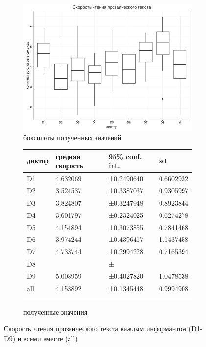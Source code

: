 \begin{figure}[t]
\begin{subfigure}[b]{0.53\textwidth}
        \includegraphics[width=\linewidth]{proseboxplot.pdf}
        \caption{боксплоты полученных значений}
\end{subfigure}
\hfill
\begin{subfigure}[b]{0.45\textwidth}
\small
\begin{tabular}{|l|l|l|l|}
\hline
диктор & средняя скорость & 95\% conf. int. & sd \\ \hline
D1 & 4.632069 & ±0.2490640 & 0.6602932 \\ \hline
D2 & 3.524537 & ±0.3387037 & 0.9305997 \\ \hline
D3 & 3.824807 & ±0.3247948 & 0.8923844 \\ \hline
D4 & 3.601797 & ±0.2324025 & 0.6274278 \\ \hline
D5 & 4.154894 & ±0.3073855 & 0.7841468 \\ \hline
D6 & 3.974244 & ±0.4396417 & 1.1437458 \\ \hline
D7 & 4.733744 & ±0.2994228 & 0.7165394 \\ \hline
D8 &  & ± &  \\ \hline
D9 & 5.008959 & ±0.4027820 & 1.0478538 \\ \hline
all & 4.153892 & ±0.1345448 & 0.9994908 \\ \hline
\multicolumn{1}{c}{}&\multicolumn{1}{c}{}&\multicolumn{1}{c}{}&\multicolumn{1}{c}{}\\
\multicolumn{1}{c}{}&\multicolumn{1}{c}{}&\multicolumn{1}{c}{}&\multicolumn{1}{c}{}\\
\end{tabular}
\normalsize
\caption{полученные значения}        
\end{subfigure}
\caption{Скорость чтения прозаического текста каждым информантом (D1-D9) и всеми вместе (all)}
\label{proseboxplot}
\end{figure}
